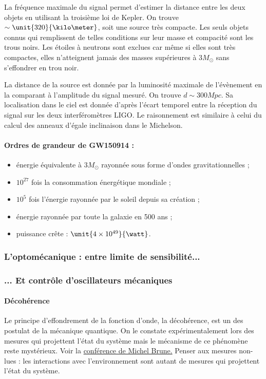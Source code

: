 \documentclass[12pt,a4paper]{article}
\begin{document}
La fréquence maximale du signal permet d'estimer la distance entre les deux objets en utilisant la troisième loi de Kepler.
On trouve $\sim \unit{320}{\kilo\meter}$, soit une source très compacte.
Les seuls objets connus qui remplissent de telles conditions sur leur masse et compacité sont les trous noirs.
Les étoiles à neutrons sont exclues car même si elles sont très compactes, elles n'atteignent jamais des masses supérieures à $\unit{3}{M_\odot}$ sans s'effondrer en trou noir.

La distance de la source est donnée par la luminosité maximale de l'évènement en la comparant à l'amplitude du signal mesuré.
On trouve $d \sim\unit{300}{Mpc}$.
Sa localisation dans le ciel est donnée d'après l'écart temporel entre la réception du signal sur les deux interféromètres LIGO.
Le raisonnement est similaire à celui du calcul des anneaux d'égale inclinaison dans le Michelson.

\paragraph{Ordres de grandeur de GW150914 :}
\begin{itemize}
\item énergie équivalente à $\unit{3}{M_\odot}$ rayonnée sous forme d'ondes gravitationnelles ;
\item $10^{27}$ fois la consommation énergétique mondiale ;
\item $10^5$ fois l'énergie rayonnée par le soleil depuis sa création ;
\item énergie rayonnée par toute la galaxie en 500 ans ;
\item puissance crête : $\unit{4\times10^{49}}{\watt}$.
\end{itemize}

\subsubsection{L'optomécanique : entre limite de sensibilité...}

\subsubsection{... Et contrôle d'oscillateurs mécaniques}

\paragraph{Décohérence\\}
Le principe d'effondrement de la fonction d'onde, la décohérence, est un des postulat de la mécanique quantique.
On le constate expérimentalement lors des mesures qui projettent l'état du système mais le mécanisme de ce phénomène reste mystérieux.
Voir la \href{https://www.youtube.com/watch?v=rCCr77aX4ek}{conférence de Michel Brune.}
Penser aux mesures non-lues : les interactions avec l'environnement sont autant de mesures qui projettent l'état du système.
\end{document}
